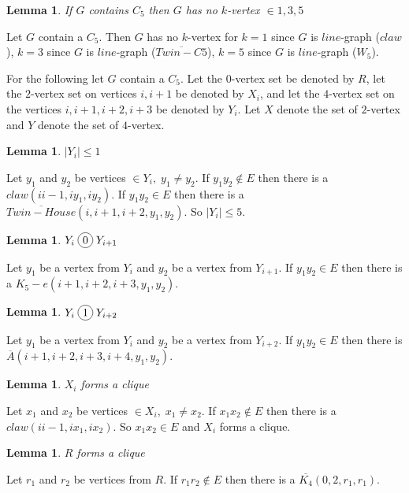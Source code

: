 \documentclass[12pt]{article}
\newcommand*\circled[1]{\tikz[baseline=(char.base)]{
            \node[shape=circle,draw,inner sep=2pt] (char) {#1};}}
\newtheorem{Lemma}[Theorem]{Lemma}
\begin{document}
\begin{Lemma}\label{lem:c5-kvertex}
If $G$ contains $C_5$ then $G$ has no $k$-vertex $\in {1,3,5}$
\end{Lemma}
 Let $G$ contain a $C_5$. Then $G$ has no $k$-vertex for $k = 1$ since $G$ is $line$-graph ($claw$), $k = 3$ since $G$ is $line$-graph ($\overline{Twin-C5}$), $k = 5$ since $G$ is $line$-graph ($W_5$). 

For the following let $G$ contain a $C_5$. Let the $0$-vertex set be denoted by $R$, let the $2$-vertex set on vertices $i, i+1$ be denoted by $X_i$, and let the $4$-vertex set on the vertices $i, i+1, i+2, i+3$ be denoted by $Y_i$. Let $X$ denote the set of $2$-vertex and $Y$ denote the set of $4$-vertex.

\begin{Lemma}\label{lem:c5-4vertex-bounded}
$|Y_i| \leq 1$
\end{Lemma}
 Let $y_1$ and $y_2$ be vertices $\in Y_i,\; y_1 \neq y_2$. If $y_1y_2 \not \in E$ then there is a $claw (ii-1, iy_1,iy_2)$. If $y_1y_2 \in E$ then there is a $\overline{Twin-House} (i,i+1,i+2,y_1,y_2)$. So $|Y_i| \leq 5$.

\begin{Lemma}\label{lem:yi-cojoin-yi1}
$Y_i \;\circled{0}\; Y_{i+1}$
\end{Lemma}
 Let $y_1$ be a vertex from $Y_i$ and $y_2$ be a vertex from $Y_{i+1}$. If $y_1y_2 \in E$ then there is a $K_5 - e (i+1, i+2, i+3, y_1, y_2)$.

\begin{Lemma}\label{lem:yi-join-yi2}
$Y_i \;\circled{1}\; Y_{i+2}$
\end{Lemma}
 Let $y_1$ be a vertex from $Y_i$ and $y_2$ be a vertex from $Y_{i+2}$. If $y_1y_2 \in E$ then there is $\overline{A} (i+1, i+2, i+3, i+4, y_1, y_2)$.

\begin{Lemma}\label{lem:xi-clique}
$X_i$ forms a clique
\end{Lemma}
 Let $x_1$ and $x_2$ be vertices $\in X_i,\; x_1 \neq x_2$. If $x_1x_2 \not \in E$ then there is a $claw (ii-1, ix_1, ix_2)$. So $x_1x_2 \in E$ and $X_i$ forms a clique.

\begin{Lemma}\label{lem:r-clique}
$R$ forms a clique
\end{Lemma}
 Let $r_1$ and $r_2$ be vertices from $R$. If $r_1r_2 \not \in E$ then there is a $\overline{K_4} (0, 2, r_1, r_1)$.
\end{document}
